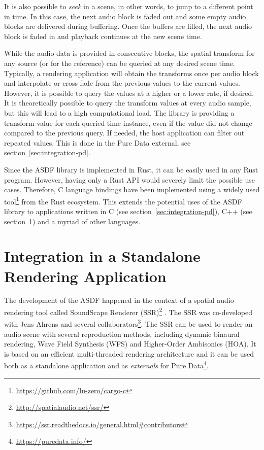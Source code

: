 It is also possible to \emph{seek} in a scene,
in other words, to jump to a different point in time.
In this case, the next audio block is faded out
and some empty audio blocks are delivered during buffering.
Once the buffers are filled, the next audio block is faded in and
playback continues at the new scene time.

While the audio data is provided in consecutive blocks,
the spatial transform for any source (or for the reference)
can be queried at any desired scene time.
Typically, a rendering application will obtain the transforms
once per audio block and interpolate or cross-fade
from the previous values to the current values.
However, it is possible to query the values at a higher or a lower rate,
if desired.
It is theoretically possible to query the transform values
at every audio sample,
but this will lead to a high computational load.
The library is providing a transform value for each queried time instance,
even if the value did not change compared to the previous query.
If needed, the host application can filter out repeated values.
This is done in the Pure Data external, see section~\ref{sec:integration-pd}.

Since the ASDF library is implemented in Rust,
it can be easily used in any Rust program.
However, having only a Rust API would severely limit the possible use cases.
Therefore, C language bindings have been implemented 
using a widely used tool\footnote{\url{https://github.com/lu-zero/cargo-c}}
from the Rust ecosystem.
This extends the potential uses of the ASDF library to applications written in
C (see section~\ref{sec:integration-pd}),
C++ (see section~\ref{sec:integration-ssr})
and a myriad of other languages.


\section{Integration in a Standalone Rendering Application}
\label{sec:integration-ssr}

The development of the ASDF happened in the context of
a spatial audio rendering tool called SoundScape Renderer (SSR)\footnote{%
\url{http://spatialaudio.net/ssr/}}
\parencite{geier2007ssr,geier2008ssr,geier2012spatial}.
The SSR was co-developed with Jens Ahrens and several collaborators\footnote{%
\url{https://ssr.readthedocs.io/general.html\#contributors}}.
The SSR can be used to render an audio scene with several reproduction methods,
including dynamic binaural rendering, Wave Field Synthesis (WFS) and Higher-Order Ambisonics (HOA).
It is based on an efficient multi-threaded rendering architecture
\parencite{geier2012apf}
and it can be used both as a standalone application and
as \emph{externals} for Pure Data\footnote{\url{https://puredata.info/}}.

